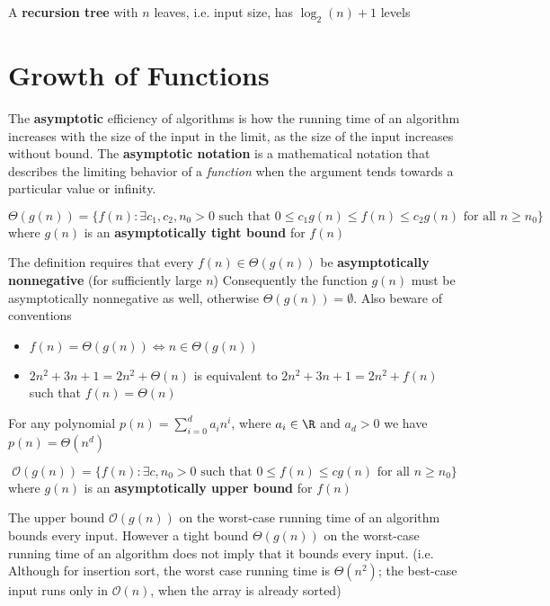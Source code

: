 \documentclass[11pt]{article}
\begin{document}
\begin{proposition*}
  A \textbf{recursion tree} with $n$ leaves, i.e. input size, has $\log_2(n) + 1$ levels
\end{proposition*}


\section*{Growth of Functions}

\begin{defn*}
  The \textbf{asymptotic} efficiency of algorithms is how the running time of an algorithm increases with the size of the input in the limit, as the size of the input increases without bound. The \textbf{asymptotic notation} is a mathematical notation that describes the limiting behavior of a \textit{function} when the argument tends towards a particular value or infinity.
\end{defn*}

\begin{defn*}
  \[
    \Theta(g(n)) = \{ f(n): \exists c_1, c_2, n_0 > 0 \text{ such that } 0\leq c_1g(n)\leq f(n) \leq c_2g(n) \text{ for all } n\geq n_0\}
  \]
  where $g(n)$ is an \textbf{asymptotically tight bound} for $f(n)$
  \begin{rem}
    The definition requires that every $f(n)\in \Theta(g(n))$ be \textbf{asymptotically nonnegative} (for sufficiently large $n$) Consequently the function $g(n)$ must be asymptotically nonnegative as well, otherwise $\Theta(g(n)) = \emptyset$. Also beware of conventions
    \begin{itemize}
      \item $f(n) = \Theta(g(n)) \iff n\in \Theta(g(n))$
      \item $2n^2 + 3n + 1 = 2n^2 + \Theta(n)$ is equivalent to $2n^2 + 3n + 1 = 2n^2 + f(n)$  such that $f(n) = \Theta(n)$
    \end{itemize}
  \end{rem}
\end{defn*}

\begin{proposition*}
  For any polynomial $p(n) = \sum_{i=0}^{d} a_i n^i$, where $a_i \in \R$ and $a_d > 0$ we have $p(n) = \Theta(n^d)$
\end{proposition*}

\begin{defn*}
  \[
    \mathcal{O}(g(n)) = \{ f(n): \exists c, n_0 > 0 \text{ such that } 0\leq f(n) \leq cg(n) \text{ for all } n\geq n_0\}
  \]
  where $g(n)$ is an \textbf{asymptotically upper bound} for $f(n)$
  \begin{rem}
    The upper bound $\mathcal{O}(g(n))$ on the worst-case running time of an algorithm bounds every input. However a tight bound $\Theta(g(n))$ on the worst-case running time of an algorithm does not imply that it bounds every input. (i.e. Although for insertion sort, the worst case running time is $\Theta(n^2)$; the best-case input runs only in $\mathcal{O}(n)$, when the array is already sorted)
  \end{rem}
\end{defn*}
\end{document}
